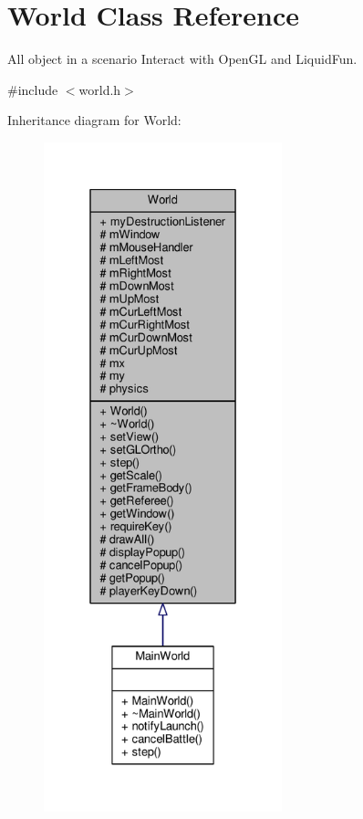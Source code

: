 \hypertarget{classWorld}{}\section{World Class Reference}
\label{classWorld}


All object in a scenario Interact with Open\+G\+L and Liquid\+Fun.  




{\ttfamily \#include $<$world.\+h$>$}



Inheritance diagram for World\+:\nopagebreak
\begin{figure}[H]
\begin{center}
\leavevmode
\includegraphics[height=550pt]{classWorld__inherit__graph}
\end{center}
\end{figure}


